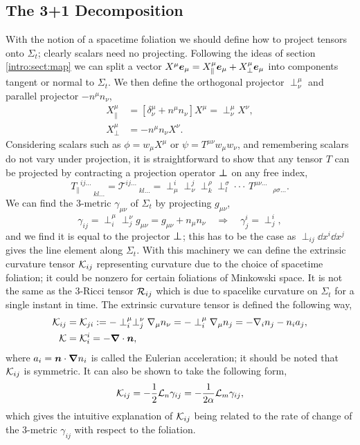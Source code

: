 \subsection{The 3+1 Decomposition} \label{nr:sec:3plus1}
With the notion of a spacetime foliation we should define how to project tensors onto $\Sigma_t$; clearly scalars need no projecting. Following the ideas of section \ref{intro:sect:map} we can split a vector $X^\mu \boldsymbol{e}_\mu = X^\mu_\| \boldsymbol{e}_\mu + X^\mu_\perp \boldsymbol{e}_\mu$ into components tangent or normal to $\Sigma_t$. We then define the orthogonal projector $\perp^\mu_\nu$ and parallel projector $-n^\mu n_\nu$,
\begin{align}X^\mu_\| &= \left[ \delta^\mu_\nu + n^\mu n_\nu\right] X^\mu  = \perp^\mu_\nu X^\nu,\\
X^\mu_\perp &= -n^\mu n_\nu X^\nu .\end{align}
Considering scalars such as $\phi = w_\mu X^\mu$ or $\psi = T^{\mu\nu}w_\mu w_\nu$, and remembering scalars do not vary under projection, it is straightforward to show that any tensor $T$ can be projected by contracting a projection operator $\boldsymbol{\perp}$ on any free index,
\begin{equation} {T_\|}^{ij ...}_{\;\;\;\;\;\;\;kl ...} = {\mathcal{T}}^{ij ...}_{\;\;\;\;\;\;\;kl ...} =\perp^{i}_{\mu}\perp^{j}_{\nu}\perp^{\rho}_{k}\perp^{\sigma}_{l}\cdot\cdot\cdot\, T^{\mu\nu ...}_{\;\;\;\;\;\;\;\;\;\;\rho\sigma ...}.\end{equation}
We can find the 3-metric $\gamma_{\mu\nu}$ of $\Sigma_t$ by projecting $g_{\mu\nu}$,
\begin{equation} \label{nr:eq:gammaij}
\gamma_{ij} = \perp^\mu_i \perp^\nu_j g_{\mu\nu} = g_{\mu\nu} + n_\mu n_\nu\quad \Rightarrow \quad \gamma^i_j = \perp^i_j,
\end{equation}
and we find it is equal to the projector $\boldsymbol{\perp}$; this has to be the case as $\perp_{ij}\dd x^i\dd x^j$ gives the line element along $\Sigma_t$. With this machinery we can define the extrinsic curvature tensor $\mathcal{K}_{ij}$ representing curvature due to the choice of spacetime foliation; it could be nonzero for certain foliations of Minkowski space. It is not the same as the 3-Ricci tensor $\mathcal{R}_{ij}$ which is due to spacelike curvature on $\Sigma_t$ for a single instant in time. The extrinsic curvature tensor is defined the following way,
\begin{align} \label{nr:eq:Kij}\mathcal{K}_{ij}  &= \mathcal{K}_{ji}:= -\perp_i^\mu \perp_j^\nu \nabla_\mu n_\nu = -\perp_i^\mu \nabla_\mu n_j = -\nabla_i n_j - n_i a_j, \\
\mathcal{K} &= \mathcal{K}_i^i = -\boldsymbol{\nabla} \cdot \boldsymbol{n},\end{align}
where $a_i = \boldsymbol{n}\cdot\boldsymbol{\nabla} n_i $ is called the Eulerian acceleration; it should be noted that $\mathcal{K}_{ij}$ is symmetric. It can also be shown to take the following form,
\begin{equation}\label{nr:eq:lmL=alnK} \mathcal{K}_{ij} = -\frac{1}{2}\mathcal{L}_n \gamma_{ij} = -\frac{1}{2\alpha}\mathcal{L}_m \gamma_{ij},\end{equation}
which gives the intuitive explanation of $\mathcal{K}_{ij}$ being related to the rate of change of the 3-metric $\gamma_{ij}$ with respect to the foliation.

